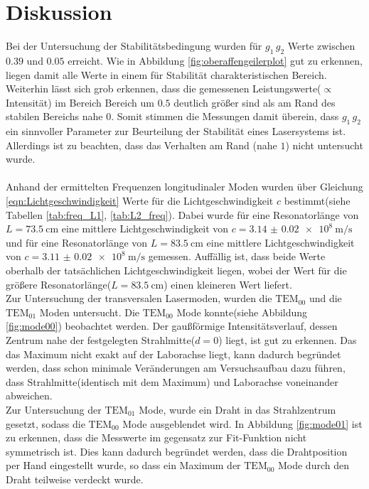 \section{Diskussion}
\label{sec:Diskussion}

Bei der Untersuchung der Stabilitätsbedingung wurden für $g_{1} \, g_{2}$
Werte zwischen $0.39$ und $0.05$ erreicht.
Wie in Abbildung \ref{fig:oberaffengeilerplot} gut zu erkennen, liegen damit alle Werte
in einem für Stabilität charakteristischen Bereich.
Weiterhin lässt sich grob erkennen, dass die gemessenen Leistungswerte($\propto$Intensität)
im Bereich Bereich um $0.5$ deutlich größer sind als am Rand des stabilen Bereichs nahe $0$.
Somit stimmen die Messungen damit überein, dass $g_{1} \, g_{2}$ ein sinnvoller Parameter zur
Beurteilung der Stabilität eines Lasersystems ist. Allerdings ist zu beachten, dass das Verhalten am
Rand (nahe $1$) nicht untersucht wurde.\\ \\


Anhand der ermittelten Frequenzen longitudinaler Moden wurden über Gleichung \eqref{eqn:Lichtgeschwindigkeit}
Werte für die Lichtgeschwindigkeit $c$ bestimmt(siehe Tabellen \ref{tab:freq_L1}, \ref{tab:L2_freq}).
Dabei wurde für eine Resonatorlänge von $L = \SI{73.5}{\centi\meter}$ eine mittlere
Lichtgeschwindigkeit von $ c = \SI{3.14(2) e8}{\meter\per\second}$
und für eine Resonatorlänge von $L = \SI{83.5}{\centi\meter}$ eine mittlere
Lichtgeschwindigkeit von $ c = \SI{3.11(2) e8}{\meter\per\second}$ gemessen.
Auffällig ist, dass beide Werte oberhalb der tatsächlichen Lichtgeschwindigkeit
liegen, wobei der Wert für die größere Resonatorlänge($L = \SI{83.5}{\centi\meter}$)
einen kleineren Wert liefert.\\
Zur Untersuchung der transversalen Lasermoden, wurden die \textbf{$\text{TEM}_{00}$}
und die \textbf{$\text{TEM}_{01}$} Moden untersucht.
Die \textbf{$\text{TEM}_{00}$} Mode konnte(siehe Abbildung \ref{fig:mode00})
beobachtet werden. Der gaußförmige Intensitätsverlauf, dessen Zentrum nahe der
festgelegten Strahlmitte($d = 0$) liegt, ist gut zu erkennen.
Das das Maximum nicht exakt auf der Laborachse liegt, kann dadurch begründet werden,
dass schon minimale Veränderungen am Versuchsaufbau dazu führen, dass Strahlmitte(identisch mit dem Maximum) und
Laborachse voneinander abweichen.\\
Zur Untersuchung der \textbf{$\text{TEM}_{01}$} Mode, wurde ein Draht in das
Strahlzentrum gesetzt, sodass die \textbf{$\text{TEM}_{00}$} Mode ausgeblendet wird.
In Abbildung \ref{fig:mode01} ist zu erkennen, dass die Messwerte im gegensatz zur
Fit-Funktion nicht symmetrisch ist. Dies kann dadurch begründet werden, dass die
Drahtposition per Hand eingestellt wurde, so dass ein Maximum der \textbf{$\text{TEM}_{00}$}
Mode durch den Draht teilweise verdeckt wurde.


